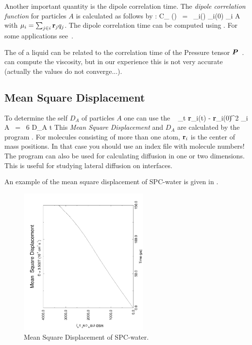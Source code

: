 Another important quantity is the dipole correlation time. The {\em dipole 
correlation function} for particles $A$ is calculated as follows by 
{\tt {}}:
\beq
C_{\mu} (\tau) ~=~
\langle {\bf \mu}_i(\tau) \cdot {\bf \mu}_i(0) \rangle_{i \in A}
\eeq
with ${\bf \mu}_i = \sum_{j \in i} {\bf r}_j q_j$. The dipole correlation time 
can be computed using .
For some applications see~\cite{Spoel98a}.

The  of a liquid can be related to the correlation 
time of the Pressure tensor $\mbox{\boldmath ${P}$}$~\cite{PSmith93c,Balasubramanian96}.
{\tt {}} can compute the viscosity, but in our experience this is not very
accurate (actually the values do not converge...).

\subsection{Mean Square Displacement}
\label{sec:msd}
To determine the self  $D_A$ of particles $A$ one
can use the ~\cite{Allen87}
\beq
\lim_{t \rightarrow \infty}
\langle \|{\bf r}_i(t) - {\bf r}_i(0)\|^2 \rangle_{i \in A} ~=~ 6 D_A t
\eeq
This {\em Mean Square Displacement} and $D_A$ are calculated by the
program {\tt {}}. For molecules consisting of more than one atom,
${\bf r}_i$ is the center of mass positions. In that case you should
use an index file with molecule numbers! The program can also be used
for calculating diffusion in one or two dimensions. This is useful for
studying lateral diffusion on interfaces. 

An example of the mean square displacement of SPC-water is given in
.

\begin{figure}
\centerline{
{\includegraphics[width=6.5cm,angle=270]{plots/msdwater}}}
\caption{Mean Square Displacement of SPC-water.}
\label{fig:msdwater}
\end{figure}

